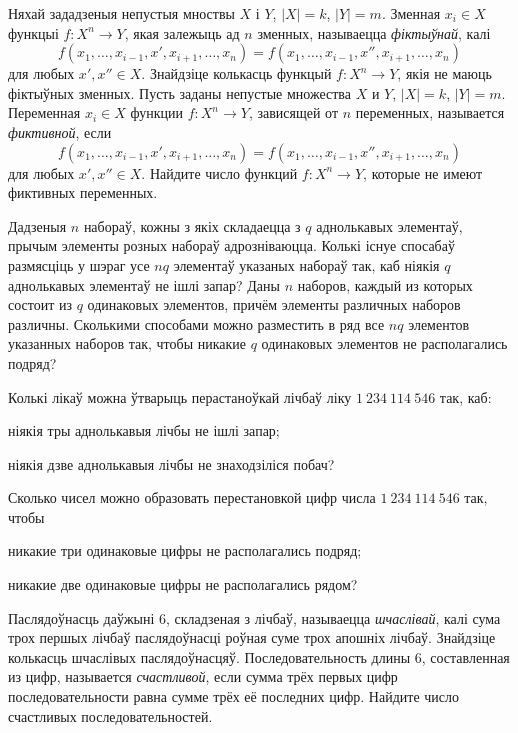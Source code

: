 \begin{problemList}
\problemItemSimple
{Няхай зададзеныя непустыя мноствы $X$ і $Y$, $|X| = k$, $|Y| = m$.
Зменная $x_i \in X$ функцыі $f\colon X^n \to Y$, якая залежыць ад $n$ зменных,
называецца \emph{фіктыўнай}, калі $$f(x_1, \ldots, x_{i - 1}, x', x_{i + 1}, \ldots, x_n) =
f(x_1, \ldots, x_{i - 1}, x'', x_{i + 1}, \ldots, x_n)$$ для любых $x', x'' \in X$.
Знайдзіце колькасць функцый $f\colon X^n \to Y$, якія не маюць фіктыўных зменных.}
{Пусть заданы непустые множества $X$ и $Y$, $|X| = k$, $|Y| = m$.
Переменная $x_i \in X$ функции $f\colon X^n \to Y$, зависящей от $n$ переменных,
называется \emph{фиктивной}, если $$f(x_1, \ldots, x_{i - 1}, x', x_{i + 1}, \ldots, x_n) =
f(x_1, \ldots, x_{i - 1}, x'', x_{i + 1}, \ldots, x_n)$$ для любых $x', x'' \in X$.
Найдите число функций $f\colon X^n \to Y$, которые не имеют фиктивных переменных.}

\bigskip

\problemItemSimple
{Дадзеныя $n$ набораў, кожны з якіх складаецца з $q$ аднолькавых элементаў, прычым
элементы розных набораў адрозніваюцца. Колькі існуе спосабаў размясціць у шэраг
усе $nq$ элементаў указаных набораў так, каб ніякія $q$ аднолькавых элементаў
не ішлі запар?}
{Даны $n$ наборов, каждый из которых состоит из $q$ одинаковых элементов, причём
элементы различных наборов различны. Сколькими способами можно разместить в ряд
все $nq$ элементов указанных наборов так, чтобы никакие $q$ одинаковых элементов
не располагались подряд?}

\newpage

\problemItemSimple
{%
Колькі лікаў можна ўтварыць перастаноўкай лічбаў ліку $1~234~114~546$ так, каб:
\begin{belarusianEnumerate}
  \item ніякія тры аднолькавыя лічбы не ішлі запар;
  \item ніякія дзве аднолькавыя лічбы не знаходзіліся побач?
\end{belarusianEnumerate}
}
{%
Сколько чисел можно образовать перестановкой цифр числа $1~234~114~546$ так, чтобы
\begin{russianEnumerate}
  \item никакие три одинаковые цифры не располагались подряд;
  \item никакие две одинаковые цифры не располагались рядом?
\end{russianEnumerate}
}

\bigskip

\problemItemSimple
{Паслядоўнасць даўжыні 6, складзеная з лічбаў, называецца \emph{шчаслівай},
калі сума трох першых лічбаў паслядоўнасці роўная суме трох апошніх лічбаў.
Знайдзіце колькасць шчаслівых паслядоўнасцяў.}
{Последовательность длины 6, составленная из цифр, называется \emph{счастливой},
если сумма трёх первых цифр последовательности равна сумме трёх её последних цифр.
Найдите число счастливых последовательностей.}


\end{problemList}

